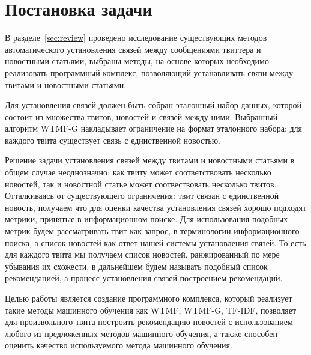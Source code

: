 \section{Постановка задачи}
    В разделе~\ref{sec:review} проведено исследование существующих методов автоматического установления связей между сообщениями твиттера и новостными статьями, выбраны методы, на основе которых необходимо реализовать программный комплекс, позволяющий устанавливать связи между твитами и новостными статьями.

    Для установления связей должен быть собран эталонный набор данных, которой состоит из множества твитов, новостей и связей между ними. Выбранный алгоритм WTMF-G накладывает ограничение на формат эталонного набора: для каждого твита существует связь с единственной новостью.

    Решение задачи установления связей между твитами и новостными статьями в общем случае неоднозначно:
    как твиту может соответствовать несколько новостей, так и новостной статье может соотвествовать несколько твитов.
    Отталкиваясь от существующего ограничения: твит связан с единственной новость, получаем что для оценки качества установления связей хорошо подходят метрики, принятые в информационном поиске.
    Для использования подобных метрик будем рассматривать твит как запрос, в терминологии информационного поиска, а список новостей как ответ нашей системы установления связей. То есть для каждого твита мы получаем список новостей, ранжированный по мере убывания их схожести, в дальнейшем будем называть подобный список рекомендацией, а процесс установления связей построением рекомендаций.

    Целью работы является создание программного комплекса, который реализует такие методы машинного обучения как WTMF, WTMF-G, TF-IDF, позволяет для произвольного твита построить рекомендацию новостей с использованием любого из предложенных методов машинного обучения, а также способен оценить качество используемого метода машинного обучения. 